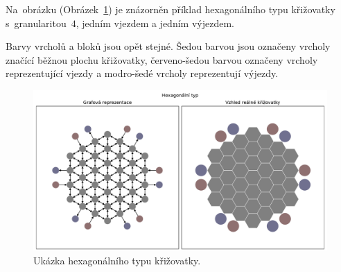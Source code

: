 Na~obrázku (Obrázek~\ref{fig:hexagonal_type_graph}) je znázorněn příklad hexagonálního typu křižovatky s~granularitou~$4$,
jedním vjezdem a jedním výjezdem.

Barvy vrcholů a bloků jsou opět stejné.
Šedou barvou jsou označeny vrcholy značící běžnou plochu křižovatky,
červeno-šedou barvou označeny vrcholy reprezentující vjezdy a modro-šedé vrcholy reprezentují výjezdy.

\begin{figure}[h]
  \centering
  \includegraphics[width=\textwidth]{../img/Hexagonal_grid}
  \caption{Ukázka hexagonálního typu křižovatky.}
  \label{fig:hexagonal_type_graph}
\end{figure}
